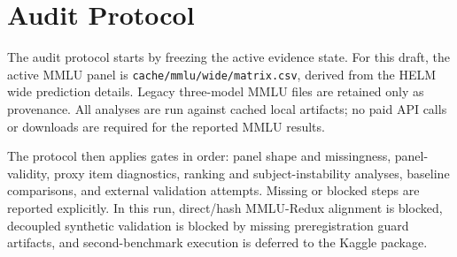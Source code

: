 \section{Audit Protocol}

The audit protocol starts by freezing the active evidence state. For this draft, the active MMLU
panel is \texttt{cache/mmlu/wide/matrix.csv}, derived from the HELM wide prediction details. Legacy
three-model MMLU files are retained only as provenance. All analyses are run against cached local
artifacts; no paid API calls or downloads are required for the reported MMLU results.

The protocol then applies gates in order: panel shape and missingness, panel-validity, proxy item
diagnostics, ranking and subject-instability analyses, baseline comparisons, and external validation
attempts. Missing or blocked steps are reported explicitly. In this run, direct/hash MMLU-Redux
alignment is blocked, decoupled synthetic validation is blocked by missing preregistration guard
artifacts, and second-benchmark execution is deferred to the Kaggle package.
